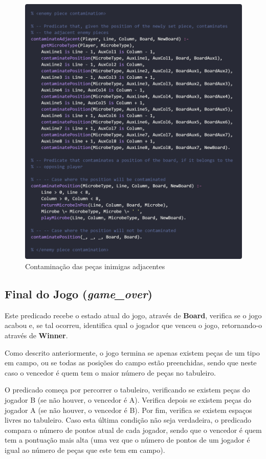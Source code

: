 \documentclass[a4paper]{article}
\begin{document}
\begin{figure}[hbp!]
    \centering
    \includegraphics[width=\linewidth]{prints/move-enemy-contamination.png}
    \caption{Contaminação das peças inimigas adjacentes}
    \label{fig}
\end{figure}

\newpage\subsection{Final do Jogo (\textit{game\_over})} 

\bigskip
Este predicado recebe o estado atual do jogo, através de \textbf{Board}, verifica se o jogo acabou e, se tal ocorreu, identifica qual o jogador que venceu o jogo, retornando-o através de \textbf{Winner}.

\bigskip
Como descrito anteriormente, o jogo termina se apenas existem peças de um tipo em campo, ou se todas as posições do campo estão preenchidas, sendo que neste caso o vencedor é quem tem o maior número de peças no tabuleiro.

\bigskip
O predicado começa por percorrer o tabuleiro, verificando se existem peças do jogador B (se não houver, o vencedor é A). Verifica depois se existem peças do jogador A (se não houver, o vencedor é B). Por fim, verifica se existem espaços livres no tabuleiro. Caso esta última condição não seja verdadeira, o predicado compara o número de pontos atual de cada jogador, sendo que o vencedor é quem tem a pontuação mais alta (uma vez que o número de pontos de um jogador é igual ao número de peças que este tem em campo). 
\end{document}
